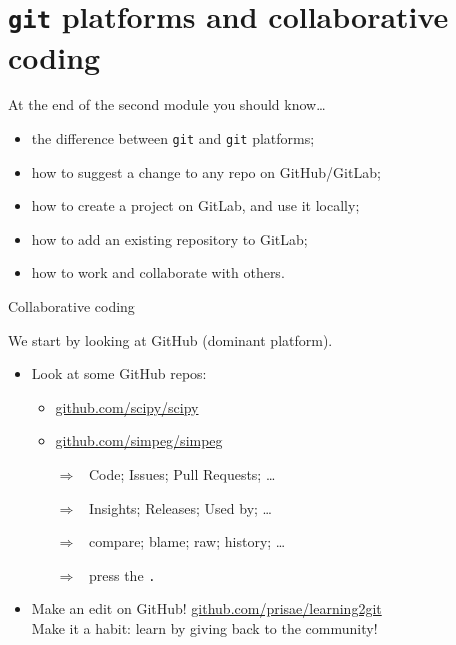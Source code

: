 \documentclass[aspectratio=169]{beamer}
\newcommand{\dra}{\ensuremath{\Rightarrow }~}
\newcommand{\ato}{\addtocounter{framenumber}{1}}
\newcommand{\code}[1]{\texttt{\color{mygreen}#1}}
\begin{document}
\ato %
\section{\code{git} platforms and collaborative coding}

\begin{frame}
  {At the end of the second module you should know\ldots}
  \begin{itemize}\itemsep0.5cm
    \item the difference between \code{git} and \code{git} platforms;
    \item how to suggest a change to any repo on GitHub/GitLab;
    \item how to create a project on GitLab, and use it locally;
    \item how to add an existing repository to GitLab;
    \item how to work and collaborate with others.
  \end{itemize}
\end{frame}

\begin{frame}
  {Collaborative coding}

  We start by looking at GitHub (dominant platform).

  \begin{itemize}
    \item Look at some GitHub repos:
      \begin{itemize}
        \item \href{https://github.com/scipy/scipy}{github.com/scipy/scipy}
        \item \href{https://github.com/simpeg/simpeg}{github.com/simpeg/simpeg}
        \item[\dra] Code; Issues; Pull Requests; \ldots
        \item[\dra] Insights; Releases; Used by; \ldots
        \item[\dra] compare; blame; raw; history; \ldots
        \item[\dra] press the \code{.}
      \end{itemize}
    \item Make an edit on GitHub!
      \href{https://github.com/prisae/learning2git}{github.com/prisae/learning2git}
      \\
      \alert{Make it a habit: learn by giving back to the community!}
  \end{itemize}
\end{frame}
\end{document}
